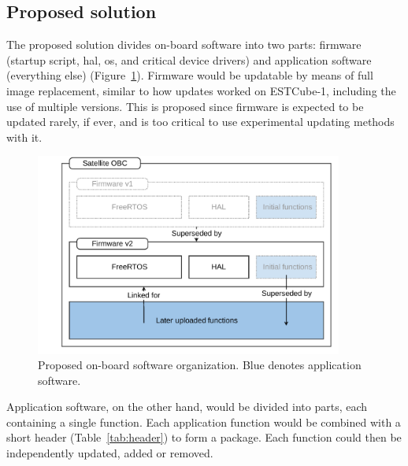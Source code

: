 \subsection{Proposed solution}

The proposed solution divides on-board software into two parts: firmware (startup script, \gls{hal}, \gls{os}, and critical device drivers) and application software (everything else) (Figure~\ref{fig:swOrg}). Firmware would be updatable by means of full image replacement, similar to how updates worked on ESTCube-1, including the use of multiple versions. This is proposed since firmware is expected to be updated rarely, if ever, and is too critical to use experimental updating methods with it.

\begin{figure}[ht]
	\centering
	\includegraphics[width=0.9\textwidth]{figures/On-board_software_organization.pdf}
	\caption{Proposed on-board software organization. Blue denotes application software.}
	\label{fig:swOrg}
\end{figure}

Application software, on the other hand, would be divided into parts, each containing a single function. Each application function would be combined with a short header (Table~\ref{tab:header}) to form a package. Each function could then be independently updated, added or removed.

